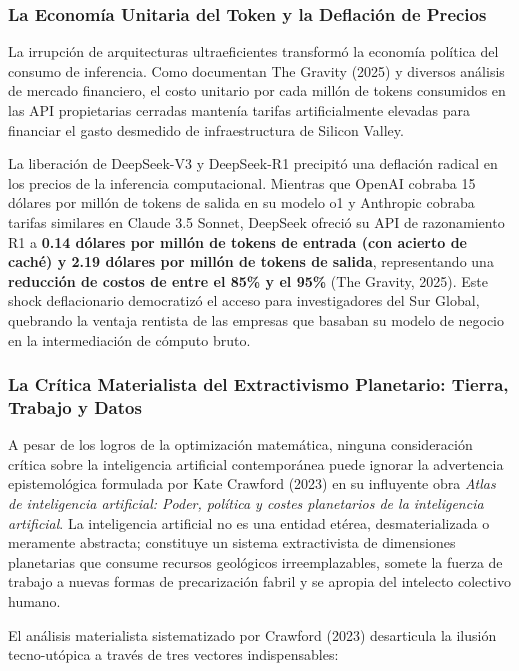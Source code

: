 \subsubsection{La Economía Unitaria del Token y la Deflación de Precios}

La irrupción de arquitecturas ultraeficientes transformó la economía política del consumo de inferencia. Como documentan The Gravity (2025) y diversos análisis de mercado financiero, el costo unitario por cada millón de tokens consumidos en las API propietarias cerradas mantenía tarifas artificialmente elevadas para financiar el gasto desmedido de infraestructura de Silicon Valley.

La liberación de DeepSeek-V3 y DeepSeek-R1 precipitó una deflación radical en los precios de la inferencia computacional. Mientras que OpenAI cobraba 15 dólares por millón de tokens de salida en su modelo o1 y Anthropic cobraba tarifas similares en Claude 3.5 Sonnet, DeepSeek ofreció su API de razonamiento R1 a \textbf{0.14 dólares por millón de tokens de entrada (con acierto de caché) y 2.19 dólares por millón de tokens de salida}, representando una \textbf{reducción de costos de entre el 85\% y el 95\%} (The Gravity, 2025). Este shock deflacionario democratizó el acceso para investigadores del Sur Global, quebrando la ventaja rentista de las empresas que basaban su modelo de negocio en la intermediación de cómputo bruto.

\subsubsection{La Crítica Materialista del Extractivismo Planetario: Tierra, Trabajo y Datos}

A pesar de los logros de la optimización matemática, ninguna consideración crítica sobre la inteligencia artificial contemporánea puede ignorar la advertencia epistemológica formulada por Kate Crawford (2023) en su influyente obra \textit{Atlas de inteligencia artificial: Poder, política y costes planetarios de la inteligencia artificial}. La inteligencia artificial no es una entidad etérea, desmaterializada o meramente abstracta; constituye un sistema extractivista de dimensiones planetarias que consume recursos geológicos irreemplazables, somete la fuerza de trabajo a nuevas formas de precarización fabril y se apropia del intelecto colectivo humano.

El análisis materialista sistematizado por Crawford (2023) desarticula la ilusión tecno-utópica a través de tres vectores indispensables:

